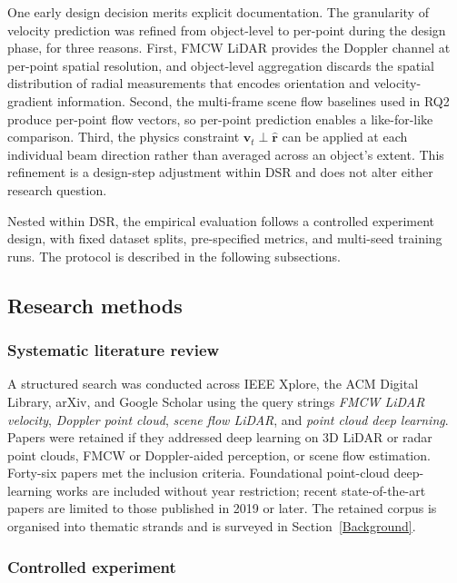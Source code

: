 \documentclass[a4paper,12pt]{article}
\begin{document}
One early design decision merits explicit documentation. The granularity of velocity prediction was refined from object-level to per-point during the design phase, for three reasons. First, FMCW LiDAR provides the Doppler channel at per-point spatial resolution, and object-level aggregation discards the spatial distribution of radial measurements that encodes orientation and velocity-gradient information. Second, the multi-frame scene flow baselines used in RQ2 produce per-point flow vectors, so per-point prediction enables a like-for-like comparison. Third, the physics constraint $\mathbf{v}_t \perp \hat{\mathbf{r}}$ can be applied at each individual beam direction rather than averaged across an object's extent. This refinement is a design-step adjustment within DSR and does not alter either research question.

Nested within DSR, the empirical evaluation follows a controlled experiment design, with fixed dataset splits, pre-specified metrics, and multi-seed training runs. The protocol is described in the following subsections.

\subsection{Research methods}

\subsubsection{Systematic literature review}

A structured search was conducted across IEEE Xplore, the ACM Digital Library, arXiv, and Google Scholar using the query strings \textit{FMCW LiDAR velocity}, \textit{Doppler point cloud}, \textit{scene flow LiDAR}, and \textit{point cloud deep learning}. Papers were retained if they addressed deep learning on 3D LiDAR or radar point clouds, FMCW or Doppler-aided perception, or scene flow estimation. Forty-six papers met the inclusion criteria. Foundational point-cloud deep-learning works are included without year restriction; recent state-of-the-art papers are limited to those published in 2019 or later. The retained corpus is organised into thematic strands and is surveyed in Section~\ref{Background}.

\subsubsection{Controlled experiment}
\end{document}
